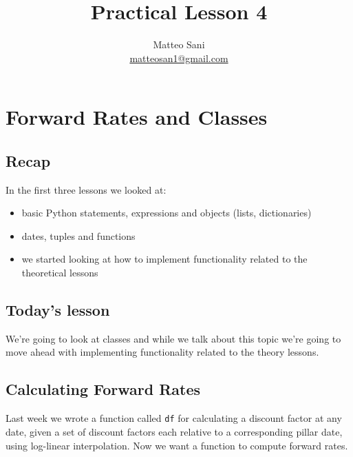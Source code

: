 \documentclass[11pt]{article}
\title{Practical Lesson 4}
\author {Matteo Sani \\\href{mailto:mattosan1@gmail.com}{matteosan1@gmail.com}}
\providecommand{\tightlist}{%
      \setlength{\itemsep}{0pt}\setlength{\parskip}{0pt}}
\begin{document}
    
    
    \maketitle
    
    

    
    \hypertarget{forward-rates-and-classes---practical-lesson-4}{%
      \section{Forward Rates and Classes}
      \label{forward-rates-and-classes---practical-lesson-4}}

\hypertarget{recap}{%
\subsection{Recap}\label{recap}}

In the first three lessons we looked at:

\begin{itemize}
\tightlist
\item
  basic Python statements, expressions and objects (lists, dictionaries)
\item
  dates, tuples and functions
\item
  we started looking at how to implement functionality related to the
  theoretical lessons
\end{itemize}

\hypertarget{todays-lesson}{%
\subsection{Today's lesson}\label{todays-lesson}}

We're going to look at classes and while we talk about this topic we're
going to move ahead with implementing functionality related to the
theory lessons.

    \hypertarget{calculating-forward-rates}{%
\subsection{Calculating Forward Rates}\label{calculating-forward-rates}}

Last week we wrote a function called \texttt{df} for calculating a
discount factor at any date, given a set of discount factors each
relative to a corresponding pillar date, using log-linear interpolation.
Now we want a function to compute forward rates.
\end{document}
